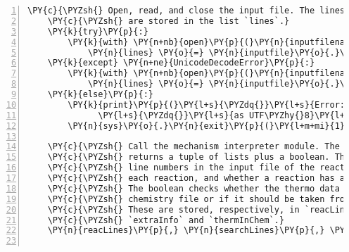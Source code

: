\begin{Verbatim}[commandchars=\\\{\},fontsize=\small,numbers=left,firstnumber=1,stepnumber=2,firstline=2]
    \PY{c}{\PYZsh{} Open, read, and close the input file. The lines of the input file}
    \PY{c}{\PYZsh{} are stored in the list `lines`.}
    \PY{k}{try}\PY{p}{:}
        \PY{k}{with} \PY{n+nb}{open}\PY{p}{(}\PY{n}{inputfilename}\PY{p}{,} \PY{l+s}{\PYZsq{}}\PY{l+s}{rt}\PY{l+s}{\PYZsq{}}\PY{p}{)} \PY{k}{as} \PY{n}{inputfile}\PY{p}{:}
            \PY{n}{lines} \PY{o}{=} \PY{n}{inputfile}\PY{o}{.}\PY{n}{readlines}\PY{p}{(}\PY{p}{)}
    \PY{k}{except} \PY{n+ne}{UnicodeDecodeError}\PY{p}{:}
        \PY{k}{with} \PY{n+nb}{open}\PY{p}{(}\PY{n}{inputfilename}\PY{p}{,}\PY{l+s}{\PYZsq{}}\PY{l+s}{rt}\PY{l+s}{\PYZsq{}}\PY{p}{,} \PY{n}{encoding}\PY{o}{=}\PY{l+s}{\PYZsq{}}\PY{l+s}{latin\PYZhy{}1}\PY{l+s}{\PYZsq{}}\PY{p}{)} \PY{k}{as} \PY{n}{inputfile}\PY{p}{:}
            \PY{n}{lines} \PY{o}{=} \PY{n}{inputfile}\PY{o}{.}\PY{n}{readlines}\PY{p}{(}\PY{p}{)}
    \PY{k}{else}\PY{p}{:}
        \PY{k}{print}\PY{p}{(}\PY{l+s}{\PYZdq{}}\PY{l+s}{Error: I can}\PY{l+s}{\PYZsq{}}\PY{l+s}{t decode the input file. Try saving it }\PY{l+s}{\PYZdq{}}
              \PY{l+s}{\PYZdq{}}\PY{l+s}{as UTF\PYZhy{}8}\PY{l+s}{\PYZdq{}}\PY{p}{)}
        \PY{n}{sys}\PY{o}{.}\PY{n}{exit}\PY{p}{(}\PY{l+m+mi}{1}\PY{p}{)}

    \PY{c}{\PYZsh{} Call the mechanism interpreter module. The mechinterp function}
    \PY{c}{\PYZsh{} returns a tuple of lists plus a boolean. The lists contain the}
    \PY{c}{\PYZsh{} line numbers in the input file of the reactions, the lines between}
    \PY{c}{\PYZsh{} each reaction, and whether a reaction has auxiliary information.}
    \PY{c}{\PYZsh{} The boolean checks whether the thermo data is available in the}
    \PY{c}{\PYZsh{} chemistry file or if it should be taken from a separate file.}
    \PY{c}{\PYZsh{} These are stored, respectively, in `reacLines`, `searchLines`,}
    \PY{c}{\PYZsh{} `extraInfo` and `thermInChem`.}
    \PY{n}{reacLines}\PY{p}{,} \PY{n}{searchLines}\PY{p}{,} \PY{n}{extraInfo}\PY{p}{,} \PY{n}{thermInChem}\PY{p}{,} \PY{o}{=} \PY{n}{mechinterp}\PY{p}{(}\PY{n}{lines}\PY{p}{)}


\end{Verbatim}
